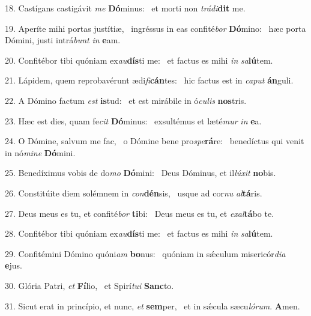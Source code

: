 18. Castígans castigávit \textit{me} \textbf{Dó}minus: \ast\  et morti non \textit{trá}\textit{di}\textbf{dit} me.\

19. Aperíte mihi portas justítiæ, \dag\  ingréssus in eas confité\textit{bor} \textbf{Dó}mino: \ast\  hæc porta Dómini, justi intrá\textit{bunt} \textit{in} \textbf{e}am.\

20. Confitébor tibi quóniam ex\textit{au}\textbf{dís}ti me: \ast\  et factus es mihi \textit{in} \textit{sa}\textbf{lú}tem.\

21. Lápidem, quem reprobavérunt ædi\textit{fi}\textbf{cán}tes: \ast\  hic factus est in \textit{ca}\textit{put} \textbf{án}guli.\

22. A Dómino factum \textit{est} \textbf{is}tud: \ast\  et est mirábile in ó\textit{cu}\textit{lis} \textbf{nos}tris.\

23. Hæc est dies, quam fe\textit{cit} \textbf{Dó}minus: \ast\  exsultémus et læté\textit{mur} \textit{in} \textbf{e}a.\

24. O Dómine, salvum me fac, \dag\  o Dómine bene pro\textit{spe}\textbf{rá}re: \ast\  benedíctus qui venit in nó\textit{mi}\textit{ne} \textbf{Dó}mini.\

25. Benedíximus vobis de do\textit{mo} \textbf{Dó}mini: \ast\  Deus Dóminus, et il\textit{lú}\textit{xit} \textbf{no}bis.\

26. Constitúite diem solémnem in \textit{con}\textbf{dén}sis, \ast\  usque ad cor\textit{nu} \textit{al}\textbf{tá}ris.\

27. Deus meus es tu, et confité\textit{bor} \textbf{ti}bi: \ast\  Deus meus es tu, et \textit{ex}\textit{al}\textbf{tá}bo te.\

28. Confitébor tibi quóniam ex\textit{au}\textbf{dís}ti me: \ast\  et factus es mihi \textit{in} \textit{sa}\textbf{lú}tem.\

29. Confitémini Dómino quóni\textit{am} \textbf{bo}nus: \ast\  quóniam in sǽculum misericór\textit{di}\textit{a} \textbf{e}jus.\

30. Glória Patri, \textit{et} \textbf{Fí}lio, \ast\  et Spirí\textit{tu}\textit{i} \textbf{Sanc}to.\

31. Sicut erat in princípio, et nunc, \textit{et} \textbf{sem}per, \ast\  et in sǽcula sæcu\textit{ló}\textit{rum}. \textbf{A}men.\

